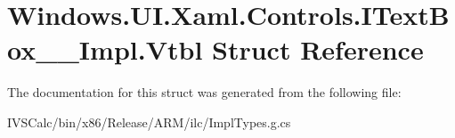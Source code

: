 \hypertarget{struct_windows_1_1_u_i_1_1_xaml_1_1_controls_1_1_i_text_box_____impl_1_1_vtbl}{}\section{Windows.\+U\+I.\+Xaml.\+Controls.\+I\+Text\+Box\+\_\+\+\_\+\+Impl.\+Vtbl Struct Reference}
\label{struct_windows_1_1_u_i_1_1_xaml_1_1_controls_1_1_i_text_box_____impl_1_1_vtbl}


The documentation for this struct was generated from the following file\+:\begin{DoxyCompactItemize}
\item 
I\+V\+S\+Calc/bin/x86/\+Release/\+A\+R\+M/ilc/Impl\+Types.\+g.\+cs\end{DoxyCompactItemize}
